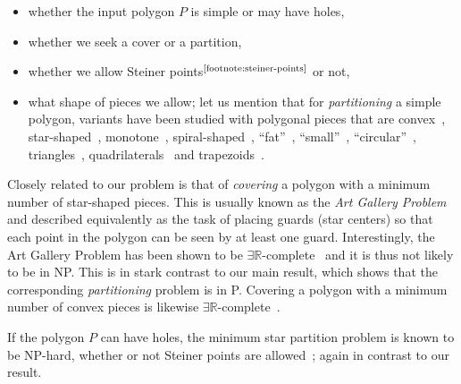 \documentclass{theoretics}
\begin{document}
\begin{itemize}[noitemsep,topsep=0pt,parsep=0pt,partopsep=0pt]
\item whether the input polygon $P$ is simple or may have holes, 
\item whether we seek a cover or a partition,
\item whether we allow Steiner points${}^\text{\ref{footnote:steiner-points}}$ or not,
\item what shape of pieces we allow; let us mention that for \emph{partitioning} a simple polygon, variants have been studied with polygonal pieces that are convex~\cite{DBLP:journals/tc/FengP75,DBLP:journals/tc/Schachter78,chazelle1985optimal,DBLP:journals/siamcomp/Keil85,DBLP:conf/focs/Chazelle82,DBLP:journals/iandc/HertelM85,DBLP:journals/ijcga/KeilS02}, star-shaped~\cite{DBLP:journals/tc/FengP75,DBLP:journals/siamcomp/Keil85,DBLP:journals/algorithmica/LiuN91}, monotone~\cite{DBLP:journals/ipl/GareyJPT78,DBLP:journals/ipl/LiuN88}, spiral-shaped~\cite{DBLP:journals/siamcomp/Keil85}, ``fat''~\cite{DBLP:journals/comgeo/Kreveld98,DBLP:journals/comgeo/Damian04,DBLP:conf/cccg/BuchinS21}, ``small''~\cite{DBLP:conf/esa/ArkinD0GMPT20,damian2004computing}, ``circular''~\cite{DBLP:conf/cccg/Damian-IordacheO03}, triangles~\cite{DBLP:journals/jal/AsanoAP86,DBLP:journals/dcg/Chazelle91}, quadrilaterals~\cite{DBLP:conf/compgeom/Lubiw85,DBLP:conf/compgeom/Muller-HannemannW97} and trapezoids~\cite{DBLP:journals/jacm/AsanoAI86}.
\end{itemize}

Closely related to our problem is that of \emph{covering} a polygon with a minimum number of star-shaped pieces.
This is usually known as the \emph{Art Gallery Problem} and described equivalently as the task of placing guards (star centers) so that each point in the polygon can be seen by at least one guard.
Interestingly, the Art Gallery Problem has been shown to be $\exists \mathbb R$-complete~\cite{DBLP:journals/jacm/AbrahamsenAM22} and it is thus not likely to be in \textsf{NP}. This is in stark contrast to our main result, which shows that the corresponding \emph{partitioning} problem is in \textsf{P}.
Covering a polygon with a minimum number of convex pieces is likewise $\exists \mathbb R$-complete~\cite{DBLP:conf/focs/Abrahamsen21}.

If the polygon $P$ can have holes, the minimum star partition problem is known to be \textsf{NP}-hard, whether or not Steiner points are allowed~\cite{o1987art}; again in contrast to our result.
\end{document}
